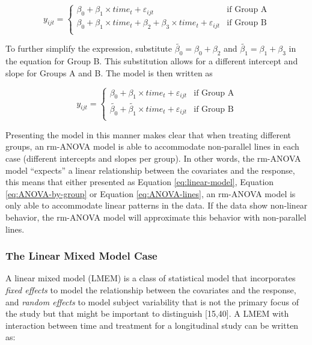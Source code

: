 \documentclass[
]{article}
\begin{document}
\begin{equation}
y_{ijt} = \begin{cases}
\beta_0 + \beta_1\times time_{t}+\varepsilon_{ijt}   & \mbox{if Group A}\\
\beta_0 + \beta_1 \times time_{t} + \beta_2+\beta_3 \times time_{t}+\varepsilon_{ijt}  & \mbox{if Group B}\\
\end{cases}
\label{eq:ANOVA-by-group}
\end{equation}

To further simplify the expression, substitute \(\widetilde{\beta_{0}}=\beta_0+\beta_{2}\) and \(\widetilde{\beta_{1}}=\beta_{1}+\beta_{3}\) in the equation for Group B. This substitution allows for a different intercept and slope for Groups A and B. The model is then written as

\begin{equation}
y_{ijt} = \begin{cases}
\beta_0 + \beta_1\times time_{t}+\varepsilon_{ijt}   & \mbox{if Group A}\\
\widetilde{\beta_{0}} + \widetilde{\beta_1} \times time_{t}+\varepsilon_{ijt}  & \mbox{if Group B}\\
\end{cases}
\label{eq:ANOVA-lines}
\end{equation}

Presenting the model in this manner makes clear that when treating different groups, an rm-ANOVA model is able to accommodate non-parallel lines in each case (different intercepts and slopes per group). In other words, the rm-ANOVA model ``expects'' a linear relationship between the covariates and the response, this means that either presented as Equation \eqref{eq:linear-model}, Equation \eqref{eq:ANOVA-by-group} or Equation \eqref{eq:ANOVA-lines}, an rm-ANOVA model is only able to accommodate linear patterns in the data. If the data show non-linear behavior, the rm-ANOVA model will approximate this behavior with non-parallel lines.

\hypertarget{the-linear-mixed-model-case}{%
\subsubsection{The Linear Mixed Model Case}\label{the-linear-mixed-model-case}}

A linear mixed model (LMEM) is a class of statistical model that incorporates \emph{fixed effects} to model the relationship between the covariates and the response, and \emph{random effects} to model subject variability that is not the primary focus of the study but that might be important to distinguish {[}15,40{]}. A LMEM with interaction between time and treatment for a longitudinal study can be written as:
\end{document}
